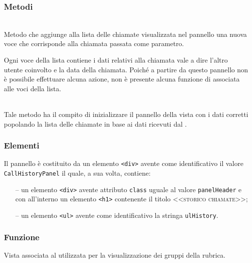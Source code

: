 \subsubsection*{Metodi}
\begin{description}

  \item{}\\
  Metodo che aggiunge alla lista delle chiamate visualizzata nel pannello una nuova voce che corrisponde alla chiamata passata come parametro.
  
  Ogni voce della lista contiene i dati relativi alla chiamata vale a dire l'altro utente coinvolto e la data della chiamata. Poiché a partire da questo pannello non è possibile effettuare alcuna azione, non è presente alcuna funzione di  associata alle voci della lista.
  
  \item{}\\
  Tale metodo ha il compito di inizializzare il pannello della vista con i dati corretti popolando la lista delle chiamate in base ai dati ricevuti dal .
  
\end{description}

\subsubsection*{Elementi}
Il pannello è costituito da un elemento \verb'<div>' avente come identificativo il valore \verb'CallHistoryPanel' il quale, a sua volta, contiene:
\begin{itemize}
  \item[--] un elemento \verb'<div>' avente attributo \verb'class' uguale al valore \verb'panelHeader' e con all'interno un elemento \verb'<h1>' contenente il titolo \textsc{<<storico chiamate>>};
  \item[--] un elemento \verb'<ul>' avente come identificativo la stringa \verb'ulHistory'.
\end{itemize}






\subsubsection*{Funzione}
Vista associata al  utilizzata per la visualizzazione dei gruppi della rubrica.

